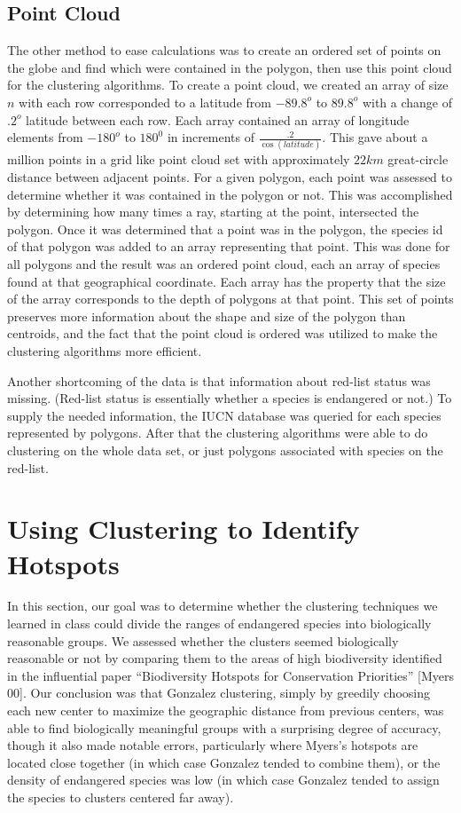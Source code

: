 \documentclass[11pt, fullpage,letterpaper]{article}
\renewcommand{\cite}[1]{[#1]}
\begin{document}
	\subsection{Point Cloud}
		The other method to ease calculations was to create an ordered set of points on the globe and find which were contained in the polygon, then use this point cloud for the clustering algorithms. To create a point cloud, we created an array of size $n$ with each row corresponded to a latitude from $-89.8^o$ to $89.8^o$ with a change of $.2^o$ latitude between each row. Each array contained an array of longitude elements from		 $-180^o$ to $180^0$ in increments of $\frac{.2}{\cos(latitude)}$. This gave about a million points in a grid like point cloud set with approximately $22km$ great-circle distance between adjacent points. For a given polygon, each point was assessed to determine whether it was contained in the polygon or not. This was accomplished by determining how many times a ray, starting at the point, intersected the polygon. Once it was determined that a point was in the polygon, the species id of that polygon was added to an array representing that point. This was done for all polygons and the result was an ordered point cloud, each an array of species found at that geographical coordinate. Each array has the property that the size of the array corresponds to the depth of polygons at that point. This set of points preserves more information about the shape and size of the polygon than centroids, and the fact that the point cloud is ordered was utilized to make the clustering algorithms more efficient.
		
		Another shortcoming of the data is that information about red-list status was missing. (Red-list status is essentially whether a species is endangered or not.) To supply the needed information, the IUCN database was queried for each species represented by polygons. After that the clustering algorithms were able to do clustering on the whole data set, or just polygons associated with species on the red-list. 
	
	\section{Using Clustering to Identify Hotspots}
		In this section, our goal was to determine whether the clustering techniques we learned in class could divide the ranges of endangered species into biologically reasonable groups. We assessed whether the clusters seemed biologically reasonable or not by comparing them to the areas of high biodiversity identified in the influential paper ``Biodiversity Hotspots for Conservation Priorities'' \cite{Myers 00}. Our conclusion was that Gonzalez clustering, simply by greedily choosing each new center to maximize the geographic distance from previous centers, was able to find biologically meaningful groups with a surprising degree of accuracy, though it also made notable errors, particularly where Myers's hotspots are located close together (in which case Gonzalez tended to combine them), or the density of endangered species was low (in which case Gonzalez tended to assign the species to clusters centered far away).
		 
\end{document}
